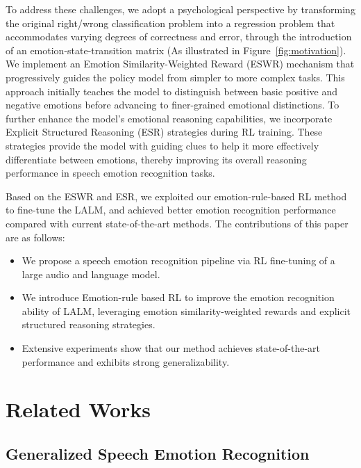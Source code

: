 \documentclass[11pt]{article}
\begin{document}
To address these challenges, we adopt a psychological perspective by transforming the original right/wrong classification problem into a regression problem that accommodates varying degrees of correctness and error, through the introduction of an emotion-state-transition matrix (As illustrated in Figure~\ref{fig:motivation}).
We implement an Emotion Similarity-Weighted Reward (ESWR) mechanism that progressively guides the policy model from simpler to more complex tasks. This approach initially teaches the model to distinguish between basic positive and negative emotions before advancing to finer-grained emotional distinctions.
To further enhance the model's emotional reasoning capabilities, we incorporate Explicit Structured Reasoning (ESR) strategies  during RL training. These strategies provide the model with guiding clues to help it more effectively differentiate between emotions, thereby improving its overall reasoning performance in speech emotion recognition tasks.

Based on the ESWR and ESR, we exploited our emotion-rule-based RL method to fine-tune the LALM, and achieved better emotion recognition performance compared with current state-of-the-art methods.
The contributions of this paper are as follows:
\begin{itemize} [leftmargin=10pt]
	\item We propose a speech emotion recognition pipeline via RL fine-tuning of a large audio and language model.
	\item We introduce Emotion-rule based RL to improve the emotion recognition ability of LALM, leveraging emotion similarity-weighted rewards and explicit structured reasoning strategies.
	\item Extensive experiments show that our method achieves state-of-the-art performance and exhibits strong generalizability.
\end{itemize}
\section{Related Works}
\subsection{Generalized Speech Emotion Recognition}
\end{document}
